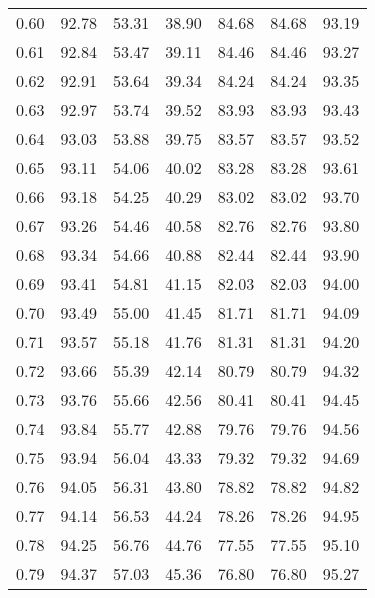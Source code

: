 \begin{tabular}{|c|c|c|c|c|c|c|}
      0.60 &     92.78 &     53.31 &      38.90 &   84.68 &      84.68 &         93.19 \\
      0.61 &     92.84 &     53.47 &      39.11 &   84.46 &      84.46 &         93.27 \\
      0.62 &     92.91 &     53.64 &      39.34 &   84.24 &      84.24 &         93.35 \\
      0.63 &     92.97 &     53.74 &      39.52 &   83.93 &      83.93 &         93.43 \\
      0.64 &     93.03 &     53.88 &      39.75 &   83.57 &      83.57 &         93.52 \\
      0.65 &     93.11 &     54.06 &      40.02 &   83.28 &      83.28 &         93.61 \\
      0.66 &     93.18 &     54.25 &      40.29 &   83.02 &      83.02 &         93.70 \\
      0.67 &     93.26 &     54.46 &      40.58 &   82.76 &      82.76 &         93.80 \\
      0.68 &     93.34 &     54.66 &      40.88 &   82.44 &      82.44 &         93.90 \\
      0.69 &     93.41 &     54.81 &      41.15 &   82.03 &      82.03 &         94.00 \\
      0.70 &     93.49 &     55.00 &      41.45 &   81.71 &      81.71 &         94.09 \\
      0.71 &     93.57 &     55.18 &      41.76 &   81.31 &      81.31 &         94.20 \\
      0.72 &     93.66 &     55.39 &      42.14 &   80.79 &      80.79 &         94.32 \\
      0.73 &     93.76 &     55.66 &      42.56 &   80.41 &      80.41 &         94.45 \\
      0.74 &     93.84 &     55.77 &      42.88 &   79.76 &      79.76 &         94.56 \\
      0.75 &     93.94 &     56.04 &      43.33 &   79.32 &      79.32 &         94.69 \\
      0.76 &     94.05 &     56.31 &      43.80 &   78.82 &      78.82 &         94.82 \\
      0.77 &     94.14 &     56.53 &      44.24 &   78.26 &      78.26 &         94.95 \\
      0.78 &     94.25 &     56.76 &      44.76 &   77.55 &      77.55 &         95.10 \\
      0.79 &     94.37 &     57.03 &      45.36 &   76.80 &      76.80 &         95.27 \\

\end{tabular}
